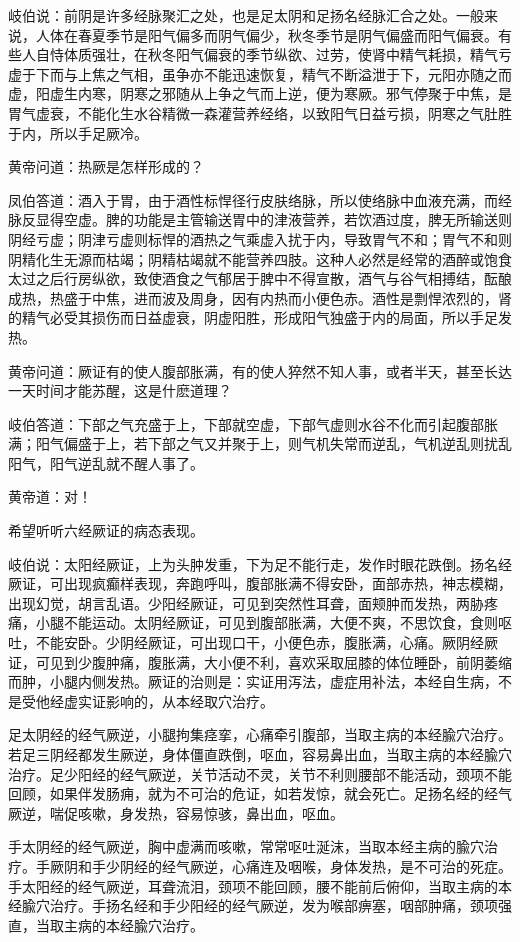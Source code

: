 \documentclass[a4paper,12pt,UTF8,twoside]{ctexbook}
\begin{document}
岐伯说：前阴是许多经脉聚汇之处，也是足太阴和足扬名经脉汇合之处。一般来说，人体在春夏季节是阳气偏多而阴气偏少，秋冬季节是阴气偏盛而阳气偏衰。有些人自恃体质强壮，在秋冬阳气偏衰的季节纵欲、过劳，使肾中精气耗损，精气亏虚于下而与上焦之气相，虽争亦不能迅速恢复，精气不断溢泄于下，元阳亦随之而虚，阳虚生内寒，阴寒之邪随从上争之气而上逆，便为寒厥。邪气停聚于中焦，是胃气虚衰，不能化生水谷精微一森灌营养经络，以致阳气日益亏损，阴寒之气肚胜于内，所以手足厥冷。

黄帝问道：热厥是怎样形成的？

凤伯答道：酒入于胃，由于酒性标悍径行皮肤络脉，所以使络脉中血液充满，而经脉反显得空虚。脾的功能是主管输送胃中的津液营养，若饮酒过度，脾无所输送则阴经亏虚；阴津亏虚则标悍的酒热之气乘虚入扰于内，导致胃气不和；胃气不和则阴精化生无源而枯竭；阴精枯竭就不能营养四肢。这种人必然是经常的酒醉或饱食太过之后行房纵欲，致使酒食之气郁居于脾中不得宣散，酒气与谷气相搏结，酝酿成热，热盛于中焦，进而波及周身，因有内热而小便色赤。酒性是剽悍浓烈的，肾的精气必受其损伤而日益虚衰，阴虚阳胜，形成阳气独盛于内的局面，所以手足发热。

黄帝问道：厥证有的使人腹部胀满，有的使人猝然不知人事，或者半天，甚至长达一天时间才能苏醒，这是什麽道理？

岐伯答道：下部之气充盛于上，下部就空虚，下部气虚则水谷不化而引起腹部胀满；阳气偏盛于上，若下部之气又并聚于上，则气机失常而逆乱，气机逆乱则扰乱阳气，阳气逆乱就不醒人事了。

黄帝道：对！

希望听听六经厥证的病态表现。

岐伯说：太阳经厥证，上为头肿发重，下为足不能行走，发作时眼花跌倒。扬名经厥证，可出现疯癫样表现，奔跑呼叫，腹部胀满不得安卧，面部赤热，神志模糊，出现幻觉，胡言乱语。少阳经厥证，可见到突然性耳聋，面颊肿而发热，两胁疼痛，小腿不能运动。太阴经厥证，可见到腹部胀满，大便不爽，不思饮食，食则呕吐，不能安卧。少阴经厥证，可出现口干，小便色赤，腹胀满，心痛。厥阴经厥证，可见到少腹肿痛，腹胀满，大小便不利，喜欢采取屈膝的体位睡卧，前阴萎缩而肿，小腿内侧发热。厥证的治则是：实证用泻法，虚症用补法，本经自生病，不是受他经虚实证影响的，从本经取穴治疗。

足太阴经的经气厥逆，小腿拘集痉挛，心痛牵引腹部，当取主病的本经腧穴治疗。若足三阴经都发生厥逆，身体僵直跌倒，呕血，容易鼻出血，当取主病的本经腧穴治疗。足少阳经的经气厥逆，关节活动不灵，关节不利则腰部不能活动，颈项不能回顾，如果伴发肠痈，就为不可治的危证，如若发惊，就会死亡。足扬名经的经气厥逆，喘促咳嗽，身发热，容易惊骇，鼻出血，呕血。

手太阴经的经气厥逆，胸中虚满而咳嗽，常常呕吐涎沫，当取本经主病的腧穴治疗。手厥阴和手少阴经的经气厥逆，心痛连及咽喉，身体发热，是不可治的死症。手太阳经的经气厥逆，耳聋流泪，颈项不能回顾，腰不能前后俯仰，当取主病的本经腧穴治疗。手扬名经和手少阳经的经气厥逆，发为喉部痹塞，咽部肿痛，颈项强直，当取主病的本经腧穴治疗。
\end{document}
